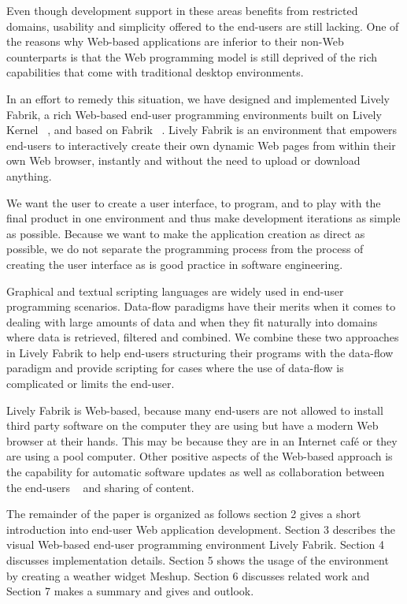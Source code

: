 \documentclass[pdftex, times, 10pt, twocolumn]{article}
\begin{document}
Even though development support in these areas benefits from restricted domains, usability and simplicity offered to the end-users are still lacking. One of the reasons why Web-based applications are inferior to their non-Web counterparts is that the Web programming model is still deprived of the rich capabilities that come with traditional desktop environments. 

In an effort to remedy this situation, we have designed and implemented Lively Fabrik, a rich Web-based end-user programming environments built on Lively Kernel ~\cite{Ingalls2007SLL}, and based on Fabrik ~\cite{Ingalls1988FVP}. Lively Fabrik is an environment that empowers end-users to interactively create their own dynamic Web pages from within their own Web browser, instantly and without the need to upload or download anything. 

We want the user to create a user interface, to program, and to play with the final product in one environment and thus make development iterations as simple as possible. Because we want to make the application creation as direct as possible, we do not separate the programming process from the process of creating the user interface as is good practice in software engineering. 

Graphical and textual scripting languages are widely used in end-user programming scenarios. Data-flow paradigms have their merits when it comes to dealing with large amounts of data and when they fit naturally into domains where data is retrieved, filtered and combined. We combine these two approaches in Lively Fabrik to help end-users structuring their programs with the data-flow paradigm and provide scripting for cases where the use of data-flow is complicated or limits the end-user.  

Lively Fabrik is Web-based, because many end-users are not allowed to install third party software on the computer they are using but have a modern Web browser at their hands. This may be because they are in an Internet café or they are using a pool computer. Other positive aspects of the Web-based approach is the capability for automatic software updates as well as collaboration between the end-users ~\cite{Ohshima2007TLW} and sharing of content.  

The remainder of the paper is organized as follows section 2 gives a short introduction into end-user Web application development. Section 3 describes the visual Web-based end-user programming environment Lively Fabrik. Section 4 discusses implementation details. Section 5 shows the usage of the environment by creating a weather widget Meshup. Section 6 discusses related work and Section 7 makes a summary and gives and outlook. 
\end{document}
